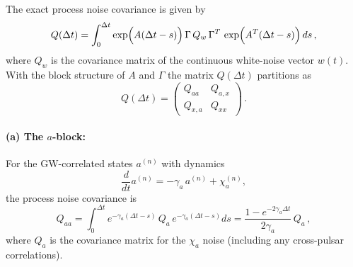 \documentclass[]{scrartcl}
\begin{document}
	The exact process noise covariance is given by
	\begin{equation}
	Q(\Delta t) = \int_{0}^{\Delta t} \exp\Bigl(A (\Delta t-s)\Bigr) \, \Gamma \, Q_w \, \Gamma^T \, \exp\Bigl(A^T (\Delta t-s)\Bigr) \, ds\,,
	\end{equation}
	where \(Q_w\) is the covariance matrix of the continuous white-noise vector \(w(t)\). With the block structure of \(A\) and \(\Gamma\) the matrix \(Q(\Delta t)\) partitions as
	\begin{equation}
	Q(\Delta t) =
	\begin{pmatrix}
	Q_{aa} & Q_{a,x} \\[1mm]
	Q_{x,a} & Q_{xx}
	\end{pmatrix}\,.
	\end{equation}
	
	\paragraph{(a) The \(a\)-block:}  
	For the GW-correlated states \(a^{(n)}\) with dynamics
	\begin{equation*}
	\frac{d}{dt}a^{(n)} = -\gamma_a\,a^{(n)} + \chi_a^{(n)},
	\end{equation*}
	the process noise covariance is
	\begin{equation}
	Q_{aa} = \int_{0}^{\Delta t} e^{-\gamma_a (\Delta t-s)} \, Q_a \, e^{-\gamma_a (\Delta t-s)} ds
	= \frac{1 - e^{-2 \gamma_a \Delta t}}{2\gamma_a}\, Q_a\,,
	\end{equation}
	where \(Q_a\) is the covariance matrix for the \(\chi_a\) noise (including any cross-pulsar correlations).
	
\end{document}
